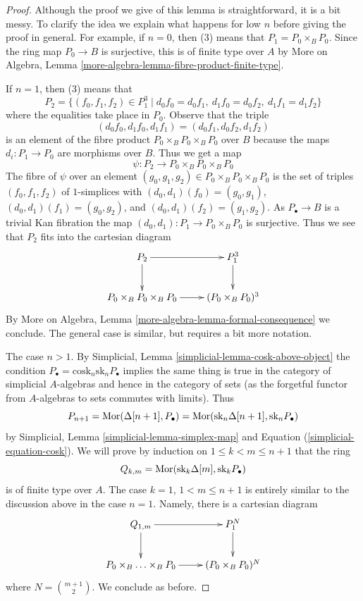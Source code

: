 \begin{proof}
Although the proof we give of this lemma is straightforward, it is a bit
messy. To clarify the idea we explain what happens for low $n$ before giving
the proof in general. For example, if $n = 0$, then (3) means that
$P_1 = P_0 \times_B P_0$. Since the ring map $P_0 \to B$ is surjective, this
is of finite type over $A$ by
More on Algebra, Lemma \ref{more-algebra-lemma-fibre-product-finite-type}.

\medskip\noindent
If $n = 1$, then (3) means that
$$
P_2 = \{(f_0, f_1, f_2) \in P_1^3 \mid
d_0f_0 = d_0f_1,\ d_1f_0 = d_0f_2,\ d_1f_1 = d_1f_2 \}
$$
where the equalities take place in $P_0$. Observe that the triple
$$
(d_0f_0, d_1f_0, d_1f_1) = (d_0f_1, d_0f_2, d_1f_2)
$$
is an element of the fibre product $P_0 \times_B P_0 \times_B P_0$ over $B$
because the maps $d_i : P_1 \to P_0$ are morphisms over $B$. Thus we get
a map
$$
\psi : P_2 \longrightarrow P_0 \times_B P_0 \times_B P_0
$$
The fibre of $\psi$ over an element
$(g_0, g_1, g_2) \in P_0 \times_B P_0 \times_B P_0$
is the set of triples $(f_0, f_1, f_2)$ of $1$-simplices
with $(d_0, d_1)(f_0) = (g_0, g_1)$, $(d_0, d_1)(f_1) = (g_0, g_2)$,
and $(d_0, d_1)(f_2) = (g_1, g_2)$. As $P_\bullet \to B$ is a trivial
Kan fibration the map $(d_0, d_1) : P_1 \to P_0 \times_B P_0$ is
surjective. Thus we see that $P_2$ fits into the cartesian diagram
$$
\xymatrix{
P_2 \ar[d] \ar[r] & P_1^3 \ar[d] \\
P_0 \times_B P_0 \times_B P_0 \ar[r] & (P_0 \times_B P_0)^3
}
$$
By More on Algebra, Lemma \ref{more-algebra-lemma-formal-consequence}
we conclude. The general case is similar, but requires a bit more notation.

\medskip\noindent
The case $n > 1$. By Simplicial, Lemma \ref{simplicial-lemma-cosk-above-object}
the condition $P_\bullet = \text{cosk}_n \text{sk}_n P_\bullet$
implies the same thing is true in the category of simplicial
$A$-algebras and hence in the category of sets (as the forgetful
functor from $A$-algebras to sets commutes with limits). Thus
$$
P_{n + 1} =
\mathop{\mathrm{Mor}}\nolimits(\Delta[n + 1], P_\bullet) =
\mathop{\mathrm{Mor}}\nolimits(\text{sk}_n \Delta[n + 1], \text{sk}_n P_\bullet)
$$
by Simplicial, Lemma \ref{simplicial-lemma-simplex-map} and
Equation (\ref{simplicial-equation-cosk}). We will prove by induction
on $1 \leq k < m \leq n + 1$ that the ring
$$
Q_{k, m} = \mathop{\mathrm{Mor}}\nolimits(\text{sk}_k \Delta[m], \text{sk}_k P_\bullet)
$$
is of finite type over $A$. The case $k = 1$, $1 < m \leq n + 1$
is entirely similar to the discussion above in the case $n = 1$.
Namely, there is a cartesian diagram
$$
\xymatrix{
Q_{1, m} \ar[d] \ar[r] & P_1^N \ar[d] \\
P_0 \times_B \ldots \times_B P_0 \ar[r] & (P_0 \times_B P_0)^N
}
$$
where $N = {m + 1 \choose 2}$. We conclude as before.


\end{proof}
